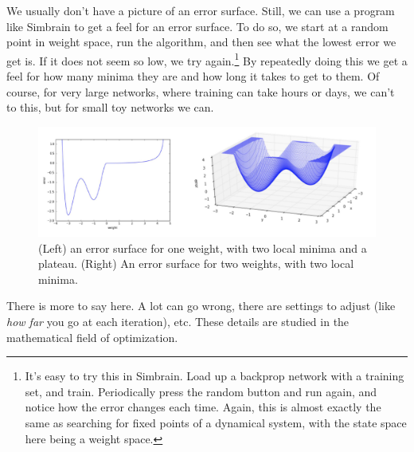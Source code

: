 We usually don't have a picture of an error surface. Still, we can use a program like Simbrain to get a feel for an error surface. To do so, we start at a random point in weight space, run the algorithm, and then see what the lowest error we get is. If it does not seem so low, we try again.\footnote{It's easy to try this in Simbrain. Load up a backprop network with a training set, and train. Periodically press the random button and run again, and notice how the error changes each time. Again, this is almost exactly the same as searching for fixed points of a dynamical system,  with the state space here being a weight space.} By repeatedly doing this we get a feel for how many minima they are and how long it takes to get to them. Of course, for very  large networks, where training can take hours or days, we can't to this, but for small toy networks we can.

\begin{figure}[h]
\centering
\includegraphics[scale=.4]{./images/LocalMinima1d2d.png}
\caption[Jeff Yoshimi and Scott Hotton.]{(Left) an error surface for one weight, with two local minima and a plateau. (Right) An error surface for two weights, with two local minima.}
\label{local_minima}
\end{figure}

 There is more to say here. A lot can go wrong, there are settings to adjust (like \emph{how far} you go at each iteration), etc. These details are studied in the mathematical field of optimization. 
 